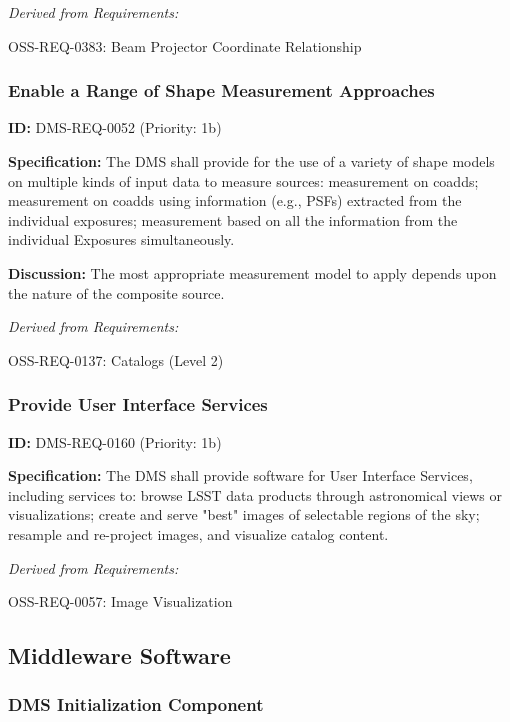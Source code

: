 \documentclass[SE,toc,lsstdraft]{lsstdoc}
\begin{document}
\emph{Derived from Requirements:}

OSS-REQ-0383:
Beam Projector Coordinate Relationship \newline

\subsubsection{Enable a Range of Shape Measurement Approaches}

\label{DMS-REQ-0052}
\textbf{ID:} DMS-REQ-0052 (Priority: 1b)

\textbf{Specification:} The DMS shall provide for the use of a variety of shape models on multiple kinds of input data to measure sources: measurement on coadds; measurement on coadds using information (e.g., PSFs) extracted from the individual exposures; measurement based on all the information from the individual Exposures simultaneously.

\textbf{Discussion: }The most appropriate measurement model to apply depends upon the nature of the composite source.

\emph{Derived from Requirements:}

OSS-REQ-0137:
Catalogs (Level 2) \newline

\subsubsection{Provide User Interface Services}

\label{DMS-REQ-0160}
\textbf{ID:} DMS-REQ-0160 (Priority: 1b)

\textbf{Specification:} The DMS shall provide software for User Interface Services, including services to: browse LSST data products through astronomical views or visualizations; create and serve "best" images of selectable regions of the sky; resample and re-project images, and visualize catalog content.

\emph{Derived from Requirements:}

OSS-REQ-0057:
Image Visualization \newline

\subsection{Middleware Software}

\subsubsection{DMS Initialization Component}
\end{document}
